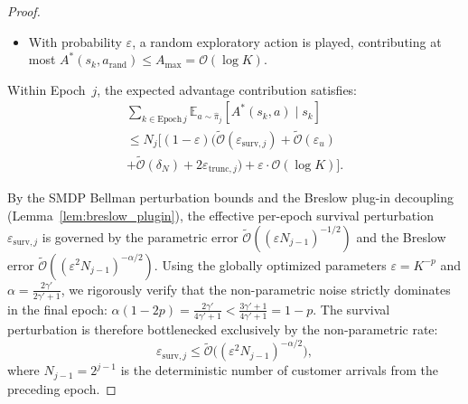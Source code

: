 \documentclass[letterpaper, 10 pt, conference]{IEEEconf}
\newcommand{\E}{\mathbb{E}}
\newcommand{\what}[1]{\widehat{#1}}
\begin{document}
\begin{proof}
\begin{itemize}
        Because $\what{\pi}_j$ unconditionally rejects jobs crossing into the PFU tail, every state-action pair evaluated as an \texttt{Accept} by $\what{\pi}_j$ resides strictly within $\mathcal{E}_{\mathrm{est},j}$. Thus, the localized pointwise advantage relative to the truncated MDP is bounded exactly by the Q-function perturbation exclusively on $\mathcal{E}_{\mathrm{est},j}$ (Proposition~\ref{prop:perturbation}). The true advantage adds the global truncation shift:
        \begin{multline}
            A^*(s_k, \what{\pi}_j(s_k)) \le A^*_{\mathrm{PFU}}(s_k, \what{\pi}_j(s_k)) + 2\|h^* - h^*_{\mathrm{PFU}}\|_\infty \\
            \leq \widetilde{\mathcal{O}}(\varepsilon_{\mathrm{surv},j}) + \widetilde{\mathcal{O}}(\varepsilon_u) + \widetilde{\mathcal{O}}(\delta_N) + 2\varepsilon_{\mathrm{trunc},j}.
        \end{multline}
        This fully decouples the pathwise statistical estimation error from the stationary truncation bias.
        \item With probability $\varepsilon$, a random exploratory action is played, contributing at most $A^*(s_k, a_{\mathrm{rand}}) \leq A_{\max} = \mathcal{O}(\log K)$.
    \end{itemize}

    Within Epoch~$j$, the expected advantage contribution satisfies:
    \begin{multline}
        \label{eq:epoch_advantage}
        \sum_{k \in \mathrm{Epoch}\,j} \E_{a \sim \what{\pi}_j}[A^*(s_k, a) \mid s_k] \\
        \leq N_j \Big[(1-\varepsilon)\big(\widetilde{\mathcal{O}}(\varepsilon_{\mathrm{surv},j}) + \widetilde{\mathcal{O}}(\varepsilon_u) \\
        + \widetilde{\mathcal{O}}(\delta_N) + 2\varepsilon_{\mathrm{trunc},j}\big) + \varepsilon \cdot \mathcal{O}(\log K)\Big].
    \end{multline}

    By the SMDP Bellman perturbation bounds and the Breslow plug-in decoupling (Lemma~\ref{lem:breslow_plugin}), the effective per-epoch survival perturbation $\varepsilon_{\mathrm{surv},j}$ is governed by the parametric error $\widetilde{\mathcal{O}}((\varepsilon N_{j-1})^{-1/2})$ and the Breslow error $\widetilde{\mathcal{O}}((\varepsilon^2 N_{j-1})^{-\alpha/2})$. Using the globally optimized parameters $\varepsilon = K^{-p}$ and $\alpha = \frac{2\gamma'}{2\gamma'+1}$, we rigorously verify that the non-parametric noise strictly dominates in the final epoch: $\alpha(1-2p) = \frac{2\gamma'}{4\gamma'+1} < \frac{3\gamma'+1}{4\gamma'+1} = 1-p$. The survival perturbation is therefore bottlenecked exclusively by the non-parametric rate:
    \begin{equation}
        \label{eq:bell_decomp}
        \varepsilon_{\mathrm{surv},j} \leq \widetilde{\mathcal{O}}\!\big((\varepsilon^2 N_{j-1})^{-\alpha/2}\big),
    \end{equation}
    where $N_{j-1} = 2^{j-1}$ is the deterministic number of customer arrivals from the preceding epoch.


\end{proof}
\end{document}
